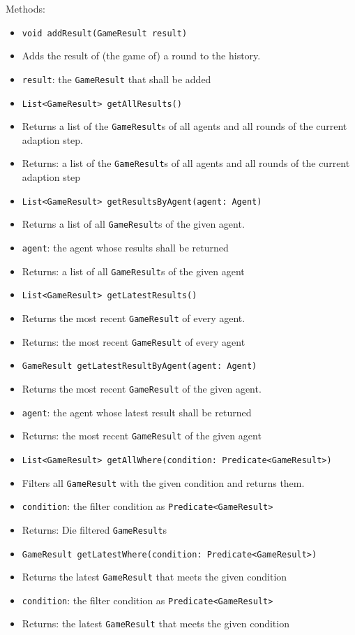 \documentclass[parskip=full,11pt]{scrartcl}
\begin{document}
Methods:
\begin{itemize}\itemsep -10pt
	\item \texttt{void addResult(GameResult result)}
	\item[] Adds the result of (the game of) a round to the history.
	\item[] \texttt{result}: the \texttt{GameResult} that shall be added
	\item \texttt{List<GameResult> getAllResults()}
	\item[] Returns a list of the \texttt{GameResult}s of all agents and all rounds of the current adaption step.
	\item[]Returns: a list of the \texttt{GameResult}s of all agents and all rounds of the current adaption step
	\item \texttt{List<GameResult> getResultsByAgent(agent: Agent)}
	\item[] Returns a list of all \texttt{GameResult}s of the given agent.
	\item[] \texttt{agent}: the agent whose results shall be returned
	\item[]Returns: a list of all \texttt{GameResult}s of the given agent
	\item \texttt{List<GameResult> getLatestResults()}
	\item[] Returns the most recent \texttt{GameResult} of every agent.
	\item[]Returns: the most recent \texttt{GameResult} of every agent
	\item \texttt{GameResult getLatestResultByAgent(agent: Agent)}
	\item[] Returns the most recent \texttt{GameResult} of the given agent.
	\item[] \texttt{agent}: the agent whose latest result shall be returned
	\item[]Returns: the most recent \texttt{GameResult} of the given agent
	\item \texttt{List<GameResult> getAllWhere(condition: Predicate<GameResult>)}
	\item[] Filters all \texttt{GameResult} with the given condition and returns them.
	\item[]\texttt{condition}: the filter condition as \texttt{Predicate<GameResult>}
	\item[]Returns: Die filtered \texttt{GameResult}s
	\item \texttt{GameResult getLatestWhere(condition: Predicate<GameResult>)}
	\item[] Returns the latest \texttt{GameResult} that meets the given condition
	\item[]\texttt{condition}: the filter condition as \texttt{Predicate<GameResult>}
	\item[]Returns: the latest \texttt{GameResult} that meets the given condition
\end{itemize}
\end{document}
